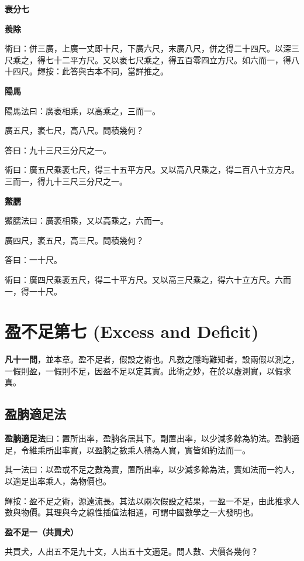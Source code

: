 \documentclass[11pt,a4paper]{article}
\newenvironment{problemenv}[1]{%
  \medskip\noindent\textbf{#1}\par\nopagebreak\smallskip
}{\medskip}
\begin{document}
\begin{problemenv}{衰分七}
\begin{problemenv}{羨除}
\textsf{術曰：}併三廣，上廣一丈即十尺，下廣六尺，末廣八尺，併之得二十四尺。以深三尺乘之，得七十二平方尺。又以袤七尺乘之，得五百零四立方尺。如六而一，得八十四尺。輝按：此答與古本不同，當詳推之。
\end{problemenv}

\begin{problemenv}{陽馬}
陽馬法曰：廣袤相乘，以高乘之，三而一。

廣五尺，袤七尺，高八尺。問積幾何？

\textsf{答曰：}九十三尺三分尺之一。

\textsf{術曰：}廣五尺乘袤七尺，得三十五平方尺。又以高八尺乘之，得二百八十立方尺。三而一，得九十三尺三分尺之一。
\end{problemenv}

\begin{problemenv}{鱉臑}
鱉臑法曰：廣袤相乘，又以高乘之，六而一。

廣四尺，袤五尺，高三尺。問積幾何？

\textsf{答曰：}一十尺。

\textsf{術曰：}廣四尺乘袤五尺，得二十平方尺。又以高三尺乘之，得六十立方尺。六而一，得一十尺。
\end{problemenv}

\newpage
\section{盈不足第七 (Excess and Deficit)}

\textbf{凡十一問}，並本章。盈不足者，假設之術也。凡數之隱晦難知者，設兩假以測之，一假則盈，一假則不足，因盈不足以定其實。此術之妙，在於以虛測實，以假求真。

\subsection{盈朒適足法}

\textbf{盈朒適足法}曰：置所出率，盈朒各居其下。副置出率，以少減多餘為約法。盈朒適足，令維乘所出率實，以盈朒之數乘人積為人實，實皆如約法而一。

其一法曰：以盈或不足之數為實，置所出率，以少減多餘為法，實如法而一約人，以適足出率乘人，為物價也。

輝按：盈不足之術，源遠流長。其法以兩次假設之結果，一盈一不足，由此推求人數與物價。其理與今之線性插值法相通，可謂中國數學之一大發明也。

\begin{problemenv}{盈不足一（共買犬）}
共買犬，人出五不足九十文，人出五十文適足。問人數、犬價各幾何？


\end{problemenv}
\end{problemenv}
\end{document}
